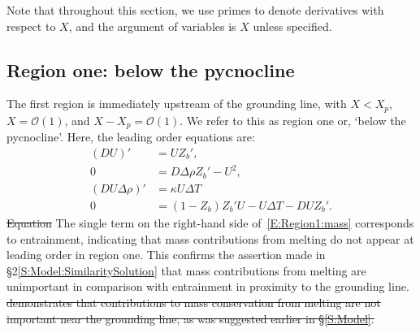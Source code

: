 \documentclass[openacc]{rsproca_new}%
\newcommand{\dd}[2]{\frac{\mathrm{d} #1}{\mathrm{d} #2}}
\newcommand{\order}[1]{\mathcal{O}(#1)}
\newcommand{\red}[1]{{\color{red} #1}}
\newcommand{\blue}[1]{{\color{blue} #1}}
\newcommand{\rout}[1]{\red{\st{#1}}}\newcommand{\ab}[1]{\textcolor{Green}{#1}}\newcommand{\about}[1]{\textcolor{Cyan}{\sout{#1}}}
\begin{document}
Note that throughout this section, we use primes to denote derivatives with respect to $X$, and the argument of variables is $X$ unless specified.



\subsection{Region one: below the pycnocline}\label{S:Asymptotics:Region1}
The first region is immediately upstream of the grounding line,  with $X  <  X_p$,  $X= \order{1}$, and $X - X_p = \mathcal{O}(1)$. We refer to this as region one or, `below the pycnocline'. Here, the leading order equations are:
\begin{align}
(DU)' &= U Z_b',\label{E:Region1:mass}\\
0 &= D \Delta \rho Z_b' - U^2, \label{E:Region1:mom}\\
(DU\Delta \rho)'  &=\kappa U \Delta T\label{E:Region1:buoyancy}\\
0&= (1  - Z_b)Z_b' U- U\Delta T - DU Z_b'.\label{E:Region1:thermal}
\end{align}
\rout{Equation }\blue{The single term on the right-hand side of}~\eqref{E:Region1:mass} \blue{corresponds to entrainment, indicating that mass contributions from melting do not appear at leading order in region one. This confirms the assertion made in \S2\ref{S:Model:SimilaritySolution} that mass contributions from melting are unimportant in comparison with entrainment in proximity to the grounding line.}  \rout{demonstrates that contributions to mass conservation from melting are not important near the grounding line, as was suggested earlier in \S\ref{S:Model}. }
\end{document}
